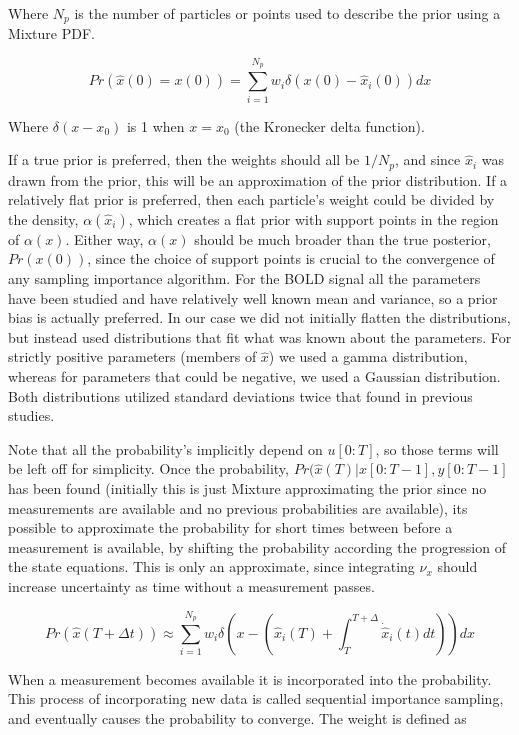 \documentclass{article}
\begin{document}
Where $N_p$ is the number of particles or points used to describe the prior 
using a Mixture PDF. 

\begin{equation}
Pr(\hat{x}(0) = x(0)) = \sum_{i=1}^{N_p} w_i\delta(x(0) - \hat{x}_i(0) ) dx
\end{equation}

Where $\delta(x-x_0)$ is 1 when $x = x_0$ (the Kronecker delta function).

If a true prior is preferred, then the weights
should all be $1/N_p$, and since $\hat{x}_i$ was drawn from the prior, this will
be an approximation of the prior distribution. If a relatively flat prior is 
preferred, then each particle's weight could be divided by the density, $\alpha(\hat{x}_i)$,
which creates a flat prior with support points in the region of $\alpha(x)$. Either
way, $\alpha(x)$ should be much broader than the true posterior, $Pr(x(0))$, since the
choice of support points is crucial to the convergence of any sampling importance
algorithm. 
For the BOLD signal all the parameters have been studied and have relatively well
known mean and variance, so a prior bias is actually preferred. In our
case we did not initially flatten the distributions, but instead used 
distributions that fit what was known about the parameters.  
For strictly positive parameters (members of $\hat{x}$) we used a gamma distribution,
whereas for parameters that could be negative, we used a Gaussian distribution. Both
distributions utilized standard deviations twice that found in previous studies.

Note that all the probability's implicitly depend on $u[0:T]$, so those terms 
will be left off for simplicity.
Once the probability, $Pr(\hat{x}(T) | \hat{x}[0:T-1], y[0:T-1]$ has been found
(initially this is just Mixture approximating the prior since no measurements are 
available and no previous probabilities are available), its possible to approximate
the probability for short times between before a measurement is available, by shifting
the probability according the progression of the state equations. This is only 
an approximate, since integrating $\nu_x$ should increase uncertainty as
time without a measurement passes. 

\begin{equation}
Pr(\hat{x}(T+\Delta t)) \approx 
\sum_{i=1}^{N_p} w_i\delta\left(x - (\hat{x}_i(T) + \int_T^{T+\Delta} \dot{\hat{x}}_i(t) dt) \right) dx
\end{equation}

When a measurement becomes available it is incorporated into the probability.
This process of incorporating new data is called sequential importance sampling,
and eventually causes the probability to converge. The weight is defined
as
\end{document}
